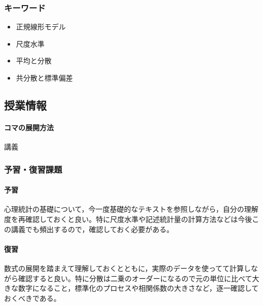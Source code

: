 \subsubsection{キーワード}
\begin{itemize}
\item 正規線形モデル
\item 尺度水準
\item 平均と分散
\item 共分散と標準偏差
\end{itemize}
\subsection{授業情報}
\paragraph{コマの展開方法}
講義
\subsubsection{予習・復習課題}
\paragraph{予習}
心理統計の基礎について，今一度基礎的なテキストを参照しながら，自分の理解度を再確認しておくと良い。特に尺度水準や記述統計量の計算方法などは今後この講義でも頻出するので，確認しておく必要がある。
\paragraph{復習}
数式の展開を踏まえて理解しておくとともに，実際のデータを使ってて計算しながら確認すると良い。特に分散は二乗のオーダーになるので元の単位に比べて大きな数字になること，標準化のプロセスや相関係数の大きさなど，逐一確認しておくべきである。